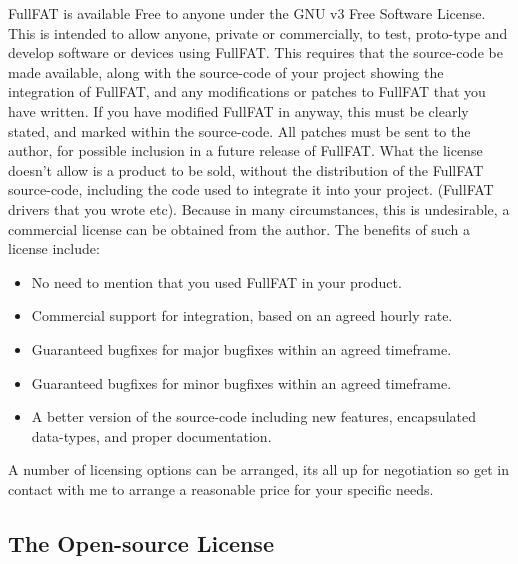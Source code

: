 FullFAT is available Free to anyone under the GNU v3 Free Software License. This is intended to allow anyone, private or commercially, to test, proto-type and develop software or devices using FullFAT. This requires that the source-code be made available, along with the source-code of your project showing the integration of FullFAT, and any modifications or patches to FullFAT that you have written.
If you have modified FullFAT in anyway, this must be clearly stated, and marked within the source-code. All patches must be sent to the author, for possible inclusion in a future release of FullFAT.
\newline
\newline
What the license doesn't allow is a product to be sold, without the distribution of the FullFAT source-code, including the code used to integrate it into your project. (FullFAT drivers that you wrote etc).
\newline
\newline
Because in many circumstances, this is undesirable, a commercial license can be obtained from the author. The benefits of such a license include:
\begin{itemize}
\item No need to mention that you used FullFAT in your product.
\item Commercial support for integration, based on an agreed hourly rate.
\item Guaranteed bugfixes for major bugfixes within an agreed timeframe.
\item Guaranteed bugfixes for minor bugfixes within an agreed timeframe.
\item A better version of the source-code including new features, encapsulated data-types, and proper documentation.
\end{itemize}

A number of licensing options can be arranged, its all up for negotiation so get in contact with me to arrange a reasonable price for your specific needs.
\newpage
\subsection{The Open-source License}
\tiny

